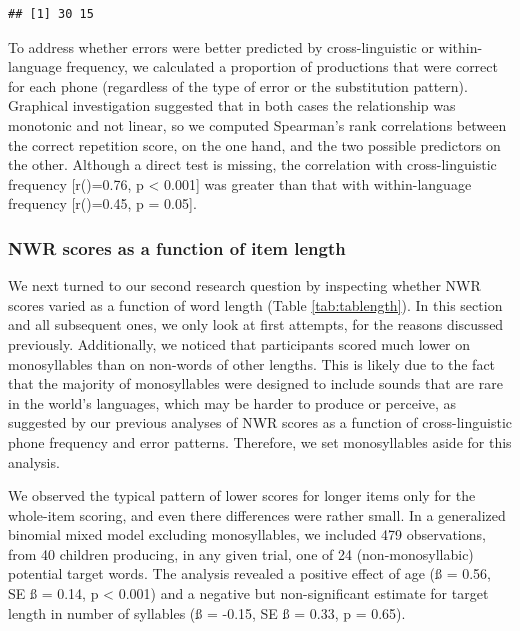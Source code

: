\documentclass[english,,man,floatsintext]{apa6}
\begin{document}
\begin{verbatim}
## [1] 30 15
\end{verbatim}

To address whether errors were better predicted by cross-linguistic or within-language frequency, we calculated a proportion of productions that were correct for each phone (regardless of the type of error or the substitution pattern). Graphical investigation suggested that in both cases the relationship was monotonic and not linear, so we computed Spearman's rank correlations between the correct repetition score, on the one hand, and the two possible predictors on the other. Although a direct test is missing, the correlation with cross-linguistic frequency {[}r()=0.76, p \textless{} 0.001{]} was greater than that with within-language frequency {[}r()=0.45, p = 0.05{]}.

\hypertarget{nwr-scores-as-a-function-of-item-length}{%
\subsubsection{NWR scores as a function of item length}\label{nwr-scores-as-a-function-of-item-length}}

We next turned to our second research question by inspecting whether NWR scores varied as a function of word length (Table \ref{tab:tablength}). In this section and all subsequent ones, we only look at first attempts, for the reasons discussed previously. Additionally, we noticed that participants scored much lower on monosyllables than on non-words of other lengths. This is likely due to the fact that the majority of monosyllables were designed to include sounds that are rare in the world's languages, which may be harder to produce or perceive, as suggested by our previous analyses of NWR scores as a function of cross-linguistic phone frequency and error patterns. Therefore, we set monosyllables aside for this analysis.

We observed the typical pattern of lower scores for longer items only for the whole-item scoring, and even there differences were rather small. In a generalized binomial mixed model excluding monosyllables, we included 479 observations, from 40 children producing, in any given trial, one of 24 (non-monosyllabic) potential target words. The analysis revealed a positive effect of age (ß = 0.56, SE ß = 0.14, p \textless{} 0.001) and a negative but non-significant estimate for target length in number of syllables (ß = -0.15, SE ß = 0.33, p = 0.65).
\end{document}
